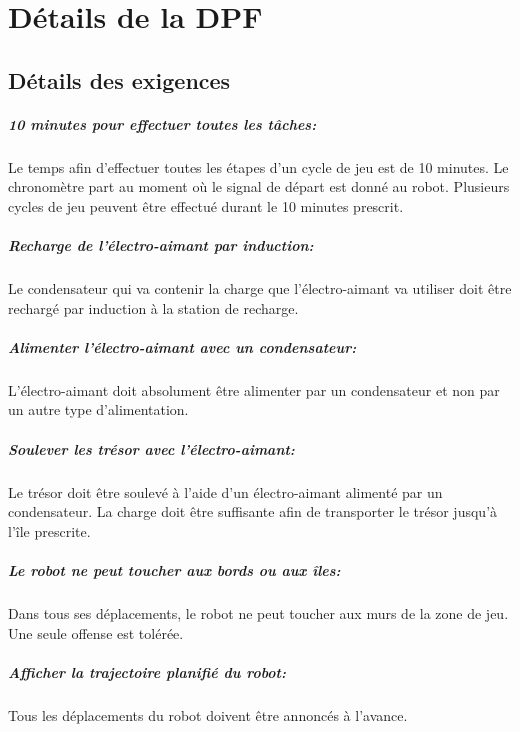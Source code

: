 \chapter{Détails de la DPF}

\section{Détails des exigences}

\paragraph{10 minutes pour effectuer toutes les tâches:}
Le temps afin d'effectuer toutes les étapes d'un cycle de jeu est de 10 minutes. Le chronomètre part au moment où le signal de départ est donné au robot.
Plusieurs cycles de jeu peuvent être effectué durant le 10 minutes prescrit.

\paragraph{Recharge de l'électro-aimant par induction:}
Le condensateur qui va contenir la charge que l'électro-aimant va utiliser doit être rechargé par induction à la station de recharge.

\paragraph{Alimenter l'électro-aimant avec un condensateur:}
L'électro-aimant doit absolument être alimenter par un condensateur et non par un autre type d'alimentation.

\paragraph{Soulever les trésor avec l'électro-aimant:}
Le trésor doit être soulevé à l'aide d'un électro-aimant alimenté par un condensateur. La charge doit être suffisante afin de transporter le trésor jusqu'à l'île prescrite.

\paragraph{Le robot ne peut toucher aux bords ou aux îles:}
Dans tous ses déplacements, le robot ne peut toucher aux murs de la zone de jeu. Une seule offense est tolérée.

\paragraph{Afficher la trajectoire planifié du robot:}
Tous les déplacements du robot doivent être annoncés à l'avance.

